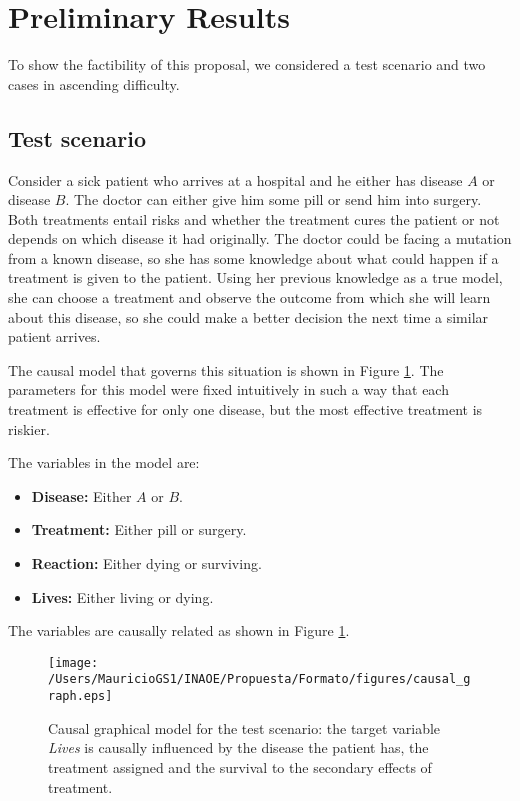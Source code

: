 \documentclass[english,letterpaper,12pt,final]{article}
\theoremstyle{definition}
\begin{document}
\newpage
\section{Preliminary Results}
To show the factibility of this proposal, we considered a test scenario and two cases in ascending difficulty.
\subsection{Test scenario}
Consider a sick patient who arrives at a hospital and he either has disease $A$ or disease $B$. The doctor can either give him some pill or send him into surgery.  Both treatments entail risks and whether the treatment cures the patient or not depends on which disease it had originally. The doctor could be facing a mutation from a known disease, so she has some knowledge about what could happen if a treatment is given to the patient. Using her previous knowledge as a true model, she can choose a treatment and observe the outcome from which she will learn about this disease, so she could make a better decision the next time a similar patient arrives.

The causal model that governs this situation is shown in Figure \ref{causal_model}. The parameters for this model were fixed intuitively in such a way that each treatment is effective for only one disease, but the most effective treatment is riskier.

The variables in the model are: 
\begin{itemize}
\item \textbf{Disease:} Either $A$ or $B$.
\item \textbf{Treatment:} Either pill or surgery.
\item \textbf{Reaction:} Either dying or surviving.
\item \textbf{Lives:} Either living or dying.
\end{itemize}

The variables are causally related as shown in Figure \ref{causal_model}.

\begin{figure}[ht]
\vskip 0.2in
\begin{center}
\centerline{\texttt{[image: /Users/MauricioGS1/INAOE/Propuesta/Formato/figures/causal\_graph.eps]}}
\caption{Causal graphical model for the test scenario: the target variable \textit{Lives} is causally influenced by the disease the patient has, the treatment assigned and the survival to the secondary effects of treatment.}
\label{causal_model}
\end{center}
\vskip -0.2in
\end{figure}
\end{document}
